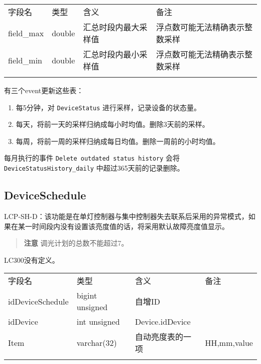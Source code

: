 \begin{longtabu}[c]{@{}lXXX@{}}
\toprule\addlinespace
字段名 & 类型 & 含义 & 备注
\\\addlinespace
\midrule\endhead
field\_max & double & 汇总时段内最大采样值 &
浮点数可能无法精确表示整数采样
\\\addlinespace
field\_min & double & 汇总时段内最小采样值 &
浮点数可能无法精确表示整数采样
\\\addlinespace
\bottomrule
\end{longtabu}

有三个event更新这些表：

\begin{enumerate}
\def\labelenumi{\arabic{enumi}.}
\itemsep1pt\parskip0pt
\item
  每5分钟，对 \texttt{DeviceStatus} 进行采样，记录设备的状态量。
\item
  每天，将前一天的采样归纳成每小时均值。删除3天前的采样。
\item
  每周，将前一周的采样归纳成每日均值。删除一周前的小时均值。
\end{enumerate}

每月执行的事件 \texttt{Delete outdated status history} 会将
\texttt{DeviceStatusHistory\_daily} 中超过365天前的记录删除。

\subsection{DeviceSchedule}\label{deviceschedule}

LCP-SH-D：该功能是在单灯控制器与集中控制器失去联系后采用的异常模式，如果在某一时间段内没有设置该亮度值的话，将采用默认故障亮度值显示。

\begin{quote}
\textbf{注意} 调光计划的总数不能超过7。
\end{quote}

LC300没有定义。

\begin{longtabu}[c]{@{}lXXX@{}}
\toprule\addlinespace
字段名 & 类型 & 含义 & 备注
\\\addlinespace
\midrule\endhead
idDeviceSchedule & bigint unsigned & 自增ID &
\\\addlinespace
idDevice & int unsigned & Device.idDevice &
\\\addlinespace
Item & varchar(32) & 自动亮度表的一项 & HH,mm,value
\\\addlinespace
\bottomrule
\end{longtabu}

